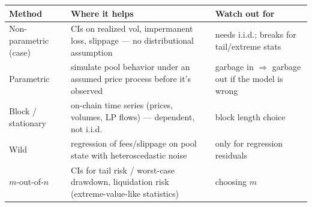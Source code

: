 \documentclass[11pt]{article}
\begin{document}
\begin{center}
\begin{tabular}{@{}p{3.6cm}p{5.4cm}p{5.4cm}@{}}
\toprule
\textbf{Method} & \textbf{Where it helps} & \textbf{Watch out for} \\
\midrule
Non-parametric (case) & CIs on realized vol, impermanent loss, slippage --- no distributional assumption & needs i.i.d.; breaks for tail/extreme stats \\
Parametric & simulate pool behavior under an assumed price process before it's observed & garbage in $\Rightarrow$ garbage out if the model is wrong \\
Block / stationary & on-chain time series (prices, volumes, LP flows) --- dependent, not i.i.d.\ & block length choice \\
Wild & regression of fees/slippage on pool state with heteroscedastic noise & only for regression residuals \\
$m$-out-of-$n$ & CIs for tail risk / worst-case drawdown, liquidation risk (extreme-value-like statistics) & choosing $m$ \\
\bottomrule
\end{tabular}
\end{center}
\end{document}
